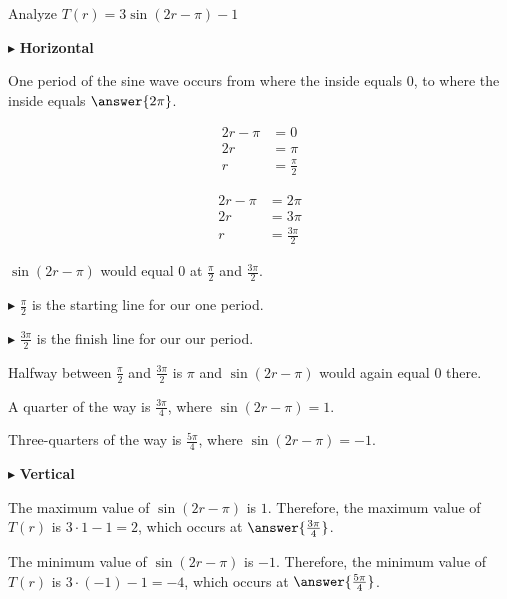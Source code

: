 \documentclass{ximera}
\begin{document}
\begin{example}



Analyze  $T(r) = 3 \sin(2r - \pi) - 1$


\begin{explanation}

$\blacktriangleright$ \textbf{Horizontal}


One period of the sine wave occurs from where the inside equals $0$, to where the inside equals $\answer{2 \pi}$.


\begin{align*}
2r - \pi & =  0 \\
2r       & =  \pi \\
r        & =  \frac{\pi}{2}
\end{align*}



\begin{align*}
2r - \pi & =  2 \pi \\
2r       & =  3 \pi \\
r        & =  \frac{3 \pi}{2}
\end{align*}


$\sin(2r - \pi)$ would equal $0$ at $\frac{\pi}{2}$ and $\frac{3 \pi}{2}$.



$\blacktriangleright$ $\frac{\pi}{2}$ is the starting line for our one period.

$\blacktriangleright$ $\frac{3 \pi}{2}$ is the finish line for our our period.




Halfway between $\frac{\pi}{2}$ and $\frac{3 \pi}{2}$ is $\pi$ and $\sin(2r - \pi)$ would again equal $0$ there.

A quarter of the way is $\frac{3 \pi}{4}$, where $\sin(2r - \pi) = 1$.

Three-quarters of the way is $\frac{5 \pi}{4}$, where $\sin(2r - \pi) = -1$.






$\blacktriangleright$ \textbf{Vertical}


The maximum value of $\sin(2r - \pi)$ is $1$.  Therefore, the maximum value of $T(r)$ is $3 \cdot 1 - 1 = 2$, which occurs at $\answer{\frac{3 \pi}{4}}$. 




The minimum value of $\sin(2r - \pi)$ is $-1$.  Therefore, the minimum value of $T(r)$ is $3 \cdot (-1) - 1 = -4$, which occurs at $\answer{\frac{5 \pi}{4}}$. 







\end{explanation}
\end{example}
\end{document}
